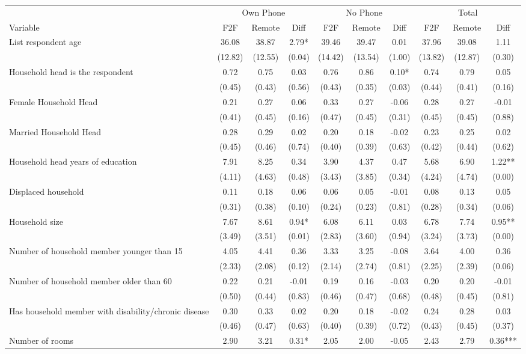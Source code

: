 \begin{tabular}{l*{9}c}
\hline\hline
 & \multicolumn{3}{c}{Own Phone} & \multicolumn{3}{c}{No Phone} & \multicolumn{3}{c}{Total}\\ 
Variable & F2F & Remote & Diff & F2F & Remote & Diff & F2F & Remote & Diff \\
\hline
List respondent age&36.08&38.87&2.79*&39.46&39.47&0.01&37.96&39.08&1.11\\
&(12.82)&(12.55)&(0.04)&(14.42)&(13.54)&(1.00)&(13.82)&(12.87)&(0.30)\\
Household head is the respondent&0.72&0.75&0.03&0.76&0.86&0.10*&0.74&0.79&0.05\\
&(0.45)&(0.43)&(0.56)&(0.43)&(0.35)&(0.03)&(0.44)&(0.41)&(0.16)\\
Female Household Head&0.21&0.27&0.06&0.33&0.27&-0.06&0.28&0.27&-0.01\\
&(0.41)&(0.45)&(0.16)&(0.47)&(0.45)&(0.31)&(0.45)&(0.45)&(0.88)\\
Married Household Head&0.28&0.29&0.02&0.20&0.18&-0.02&0.23&0.25&0.02\\
&(0.45)&(0.46)&(0.74)&(0.40)&(0.39)&(0.63)&(0.42)&(0.44)&(0.62)\\
Household head years of education&7.91&8.25&0.34&3.90&4.37&0.47&5.68&6.90&1.22**\\
&(4.11)&(4.63)&(0.48)&(3.43)&(3.85)&(0.34)&(4.24)&(4.74)&(0.00)\\
Displaced household&0.11&0.18&0.06&0.06&0.05&-0.01&0.08&0.13&0.05\\
&(0.31)&(0.38)&(0.10)&(0.24)&(0.23)&(0.81)&(0.28)&(0.34)&(0.06)\\
Household size&7.67&8.61&0.94*&6.08&6.11&0.03&6.78&7.74&0.95**\\
&(3.49)&(3.51)&(0.01)&(2.83)&(3.60)&(0.94)&(3.24)&(3.73)&(0.00)\\
Number of household member younger than 15&4.05&4.41&0.36&3.33&3.25&-0.08&3.64&4.00&0.36\\
&(2.33)&(2.08)&(0.12)&(2.14)&(2.74)&(0.81)&(2.25)&(2.39)&(0.06)\\
Number of household member older than 60&0.22&0.21&-0.01&0.19&0.16&-0.03&0.20&0.20&-0.01\\
&(0.50)&(0.44)&(0.83)&(0.46)&(0.47)&(0.68)&(0.48)&(0.45)&(0.81)\\
Has household member with disability/chronic disease&0.30&0.33&0.02&0.20&0.18&-0.02&0.24&0.28&0.03\\
&(0.46)&(0.47)&(0.63)&(0.40)&(0.39)&(0.72)&(0.43)&(0.45)&(0.37)\\
Number of rooms&2.90&3.21&0.31*&2.05&2.00&-0.05&2.43&2.79&0.36***\\

\end{tabular}
